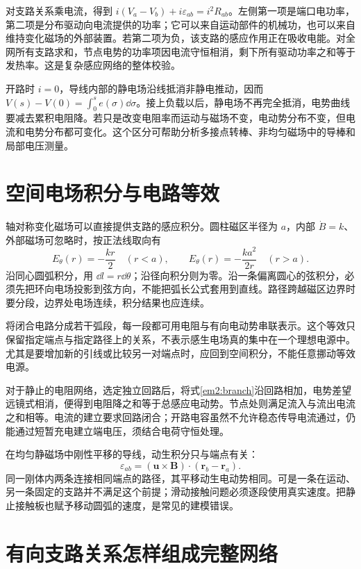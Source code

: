 对支路关系乘电流，得到 $i(V_a-V_b)+i\varepsilon_{ab}=i^2R_{ab}$。左侧第一项是端口电功率，第二项是分布驱动向电流提供的功率；它可以来自运动部件的机械功，也可以来自维持变化磁场的外部装置。若第二项为负，该支路的感应作用正在吸收电能。对全网所有支路求和，节点电势的功率项因电流守恒相消，剩下所有驱动功率之和等于发热率。这是复杂感应网络的整体校验。


开路时 $i=0$，导线内部的静电场沿线抵消非静电推动，因而 $V(s)-V(0)=\int_0^s e(\sigma)\dd\sigma$。接上负载以后，静电场不再完全抵消，电势曲线要减去累积电阻降。若只是改变电阻率而运动与磁场不变，电动势分布不变，但电流和电势分布都可变化。这个区分可帮助分析多接点转棒、非均匀磁场中的导棒和局部电压测量。



\section{空间电场积分与电路等效}

轴对称变化磁场可以直接提供支路的感应积分。圆柱磁区半径为 $a$，内部 $\dot B=k$、外部磁场可忽略时，按正法线取向有
\[E_\theta(r)=-\frac{kr}{2}\quad(r<a),\qquad E_\theta(r)=-\frac{ka^2}{2r}\quad(r>a).\]
沿同心圆弧积分，用 $\dd l=r\dd\theta$；沿径向积分则为零。沿一条偏离圆心的弦积分，必须先把环向电场投影到弦方向，不能把弧长公式套用到直线。路径跨越磁区边界时要分段，边界处电场连续，积分结果也应连续。


将闭合电路分成若干弧段，每一段都可用电阻与有向电动势串联表示。这个等效只保留指定端点与指定路径上的关系，不表示感生电场真的集中在一个理想电源中。尤其是要增加新的引线或比较另一对端点时，应回到空间积分，不能任意挪动等效电源。


对于静止的电阻网络，选定独立回路后，将式\eqref{em2:branch}沿回路相加，电势差望远镜式相消，便得到电阻降之和等于总感应电动势。节点处则满足流入与流出电流之和相等。电流的建立要求回路闭合；开路电容虽然不允许稳态传导电流通过，仍能通过短暂充电建立端电压，须结合电荷守恒处理。


在均匀静磁场中刚性平移的导线，动生积分只与端点有关：
\[\varepsilon_{ab}=(\bm u\times\bm B)\cdot(\bm r_b-\bm r_a).\]
同一刚体内两条连接相同端点的路径，其平移动生电动势相同。可是一条在运动、另一条固定的支路并不满足这个前提；滑动接触问题必须逐段使用真实速度。把静止接触板也赋予移动圆弧的速度，是常见的建模错误。





\section{有向支路关系怎样组成完整网络}

